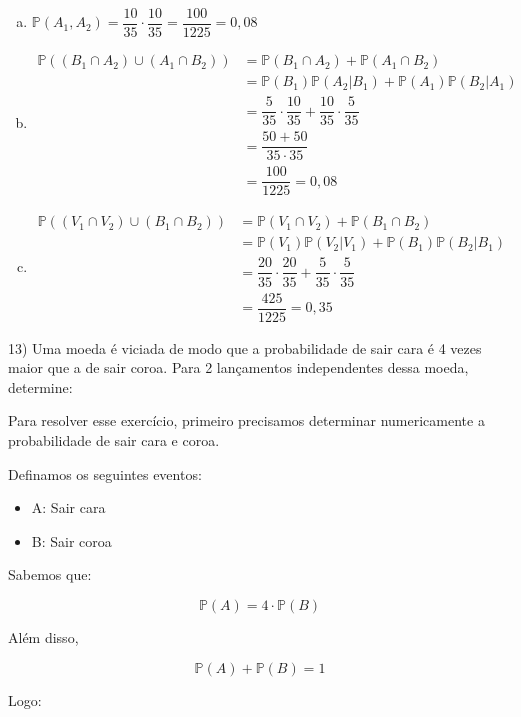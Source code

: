 \documentclass{article}
\begin{document}
\begin{enumerate}[a)] %
    \item $\mathds{P}(A_1, A_2) = \dfrac{10}{35}\cdot \dfrac{10}{35} = \dfrac{100}{1225} = 0,08$
    \item \begin{align*}
        \mathds{P}((B_1 \cap A_2) \cup (A_1 \cap B_2))  &= \mathds{P}(B_1 \cap A_2) + \mathds{P}(A_1 \cap B_2) \\
        &= \mathds{P}(B_1)\mathds{P}(A_2 | B_1) + \mathds{P}(A_1)\mathds{P}(B_2 | A_1)\\
        &= \dfrac{5}{35} \cdot \dfrac{10}{35} + \dfrac{10}{35} \cdot \dfrac{5}{35}\\
        &= \dfrac{50 + 50}{35 \cdot 35} \\
        &= \dfrac{100}{1225} = 0,08
    \end{align*}
    \item \begin{align*}
        \mathds{P}((V_1 \cap V_2) \cup (B_1 \cap B_2)) &= \mathds{P}(V_1 \cap V_2) + \mathds{P}(B_1 \cap B_2)\\
        &=\mathds{P}(V_1) \mathds{P}(V_2 | V_1) + \mathds{P}(B_1) \mathds{P}(B_2 | B_1)\\
        &=\dfrac{20}{35} \cdot  \dfrac{20}{35} + \dfrac{5}{35} \cdot  \dfrac{5}{35}\\
        &=\dfrac{425}{1225} = 0,35
    \end{align*}
\end{enumerate}

13) Uma moeda é viciada de modo que a probabilidade de sair cara é 4 vezes maior que a de sair coroa. Para 2 lançamentos independentes dessa moeda, determine:

Para resolver esse exercício, primeiro precisamos determinar numericamente a probabilidade de sair cara e coroa. 

Definamos os seguintes eventos:

\begin{itemize}
    \item A: Sair cara
    \item B: Sair coroa
\end{itemize}

Sabemos que:

$$\mathds{P}(A) = 4 \cdot \mathds{P}(B)$$

Além disso, 

$$\mathds{P}(A) + \mathds{P}(B) = 1$$

Logo:
\end{document}
